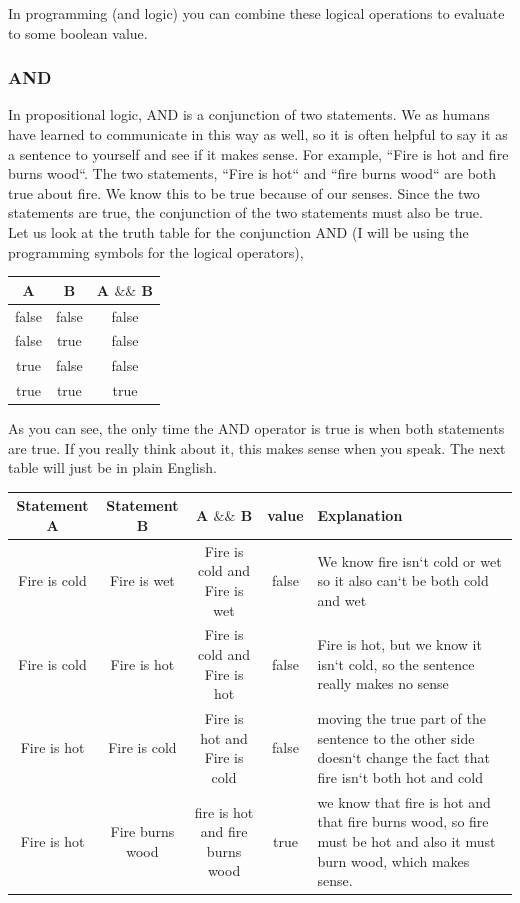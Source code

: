 \documentclass[11]{article}
\begin{document}
In programming (and logic) you can combine these logical operations to evaluate to some boolean value.\\

\subsubsection{AND}
In propositional logic, AND is a conjunction of two statements. We as humans have learned to communicate in this way as well, so it is often helpful to say it as a sentence to yourself and see if it makes sense. For example, ``Fire is hot and fire burns wood``. The two statements, ``Fire is hot`` and ``fire burns wood`` are both true about fire. We know this to be true because of our senses. Since the two statements are true, the conjunction of the two statements must also be true.\\

Let us look at the truth table for the conjunction AND (I will be using the programming symbols for the logical operators),
\begin{center}
  \begin{tabular}{ | c | c | c |}
    \hline
    A & B & A $\&\&$ B \\ \hline
    false & false & false \\ \hline
    false & true & false \\ \hline
    true & false & false \\ \hline
    true & true & true \\
    \hline
  \end{tabular}
\end{center}

As you can see, the only time the AND operator is true is when both statements are true. If you really think about it, this makes sense when you speak. The next table will just be in plain English.

\begin{center}
  \begin{tabular}{ | c | c | c | c | p{4.5cm} |}
    \hline
		Statement A & Statement B & A $\&\&$ B & value & Explanation \\ \hline
		Fire is cold & Fire is wet & Fire is cold and Fire is wet & false & We know fire isn`t cold or wet so it also can`t be both cold and wet \\  \hline
		
		Fire is cold & Fire is hot & Fire is cold and Fire is hot & false & Fire is hot, but we know it isn`t cold, so the sentence really makes no sense \\ \hline
		
		Fire is hot & Fire is cold & Fire is hot and Fire is cold & false & moving the true part of the sentence to the other side doesn`t change the fact that fire isn`t both hot and cold \\ \hline
		
		Fire is hot & Fire burns wood & fire is hot and fire burns wood & true & we know that fire is hot and that fire burns wood, so fire must be hot and also it must burn wood, which makes sense. \\
    \hline
  \end{tabular}
\end{center}
\end{document}
